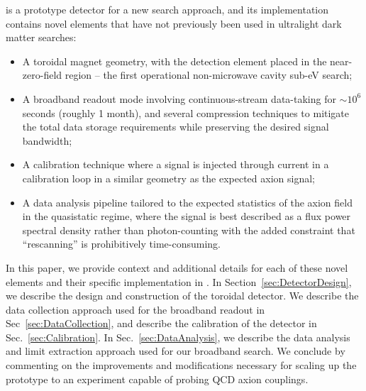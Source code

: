 \documentclass[aps,prd,amsmath,amssymb,reprint,superscriptaddress, nofootinbib,
]{revtex4-1}
\begin{document}
\abra is a prototype detector for a new search approach, and its implementation contains novel elements that have not previously been used in ultralight dark matter searches:
\begin{itemize}
    \item A toroidal magnet geometry, with the detection element placed in the near-zero-field region -- the first operational non-microwave cavity sub-eV \ADM search;
    \item A broadband readout mode involving continuous-stream data-taking for $\sim 10^{6}$ seconds (roughly 1 month), and several compression techniques to mitigate the total data storage requirements while preserving the desired signal bandwidth;
    \item A calibration technique where a signal is injected through current in a calibration loop in a similar geometry as the expected axion signal;
    \item A data analysis pipeline tailored to the expected statistics of the axion field in the quasistatic regime, where the signal is best described as a flux power spectral density rather than photon-counting with the added constraint that ``rescanning'' is prohibitively time-consuming.
\end{itemize}


In this paper, we provide context and additional details for each of these novel elements and their specific implementation in \abra. In Section~\ref{sec:DetectorDesign}, we describe the design and construction of the toroidal \abra detector. We describe the data collection approach used for the broadband readout in Sec~\ref{sec:DataCollection}, and describe the calibration of the detector in Sec.~\ref{sec:Calibration}. In Sec.~\ref{sec:DataAnalysis}, we describe the data analysis and limit extraction approach used for our broadband search. We conclude by commenting on the improvements and modifications necessary for scaling up the \abra prototype to an experiment capable of probing QCD axion couplings. 
\end{document}
